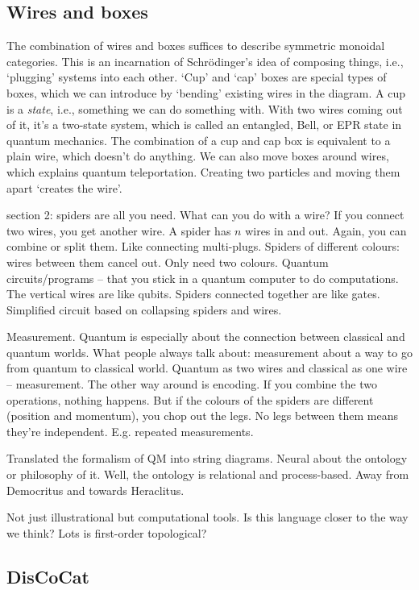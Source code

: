 \subsection*{Wires and boxes}

The combination of wires and boxes suffices to describe symmetric monoidal categories.
This is an incarnation of Schr\"odinger's idea of composing things, i.e., `plugging'
systems into each other.
`Cup' and `cap' boxes are special types of boxes, which we can introduce by `bending'
existing wires in the diagram.
A cup is a \emph{state}, i.e., something we can do something with.
With two wires coming out of it, it's a two-state system, which is called an entangled,
Bell, or EPR state in quantum mechanics.
The combination of a cup and cap box is equivalent to a plain wire, which doesn't do
anything.
We can also move boxes around wires, which explains quantum teleportation.
Creating two particles and moving them apart `creates the wire'.

section 2: spiders are all you need.
What can you do with a wire?
If you connect two wires, you get another wire.
A spider has $n$ wires in and out.
Again, you can combine or split them.
Like connecting multi-plugs.
Spiders of different colours: wires between them cancel out.
Only need two colours.
Quantum circuits/programs -- that you stick in a quantum computer to do computations.
The vertical wires are like qubits.
Spiders connected together are like gates.
Simplified circuit based on collapsing spiders and wires.

Measurement.
Quantum is especially about the connection between classical and quantum worlds.
What people always talk about: measurement about a way to go from quantum to classical
world.
Quantum as two wires and classical as one wire -- measurement.
The other way around is encoding.
If you combine the two operations, nothing happens.
But if the colours of the spiders are different (position and momentum), you chop out
the legs.
No legs between them means they're independent.
E.g. repeated measurements.

Translated the formalism of QM into string diagrams.
Neural about the ontology or philosophy of it.
Well, the ontology is relational and process-based.
Away from Democritus and towards Heraclitus.

Not just illustrational but computational tools.
Is this language closer to the way we think?
Lots is first-order topological?

\subsection*{DisCoCat}

